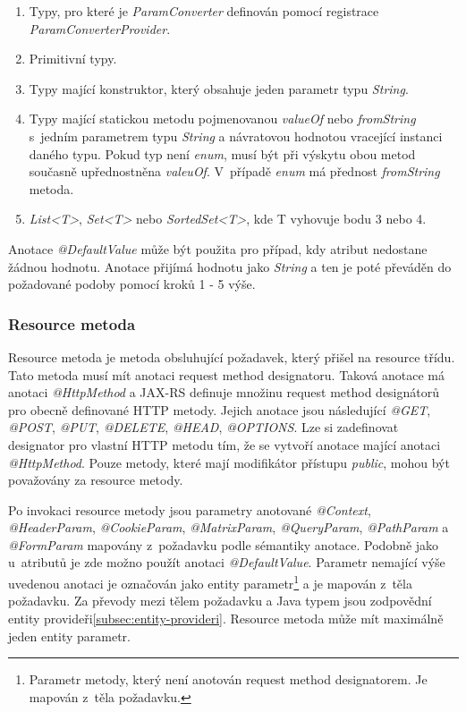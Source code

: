 \documentclass[11pt,twoside,a4paper]{book}
\begin{document}
\begin{enumerate}
  \item Typy, pro které je {\em ParamConverter} definován pomocí registrace
  {\em ParamConverterProvider}.
  \item Primitivní typy.
  \item Typy mající konstruktor, který obsahuje jeden parametr typu {\em
  String}.
  \item Typy mající statickou metodu pojmenovanou {\em valueOf} nebo {\em
  fromString} s~jedním parametrem typu {\em String} a návratovou hodnotou
  vracející instanci daného typu. Pokud typ není {\em enum}, musí být při
  výskytu obou metod současně upřednostněna {\em valeuOf}. V~případě {\em enum}
  má přednost {\em fromString} metoda.
  \item {\em List<T>}, {\em Set<T>} nebo {\em SortedSet<T>}, kde T vyhovuje bodu
  3 nebo 4.
\end{enumerate}

Anotace {\em @DefaultValue} může být použita pro případ, kdy atribut nedostane
žádnou hodnotu.
Anotace přijímá hodnotu jako {\em String} a ten je poté převáděn do požadované
podoby pomocí kroků 1 - 5 výše.

\subsubsection{Resource metoda}
\label{subsec:resource-metoda}

Resource metoda je metoda obsluhující požadavek, který přišel na resource třídu. Tato metoda
musí mít anotaci request method designatoru. Taková anotace má anotaci {\em
@HttpMethod} a JAX-RS definuje množinu request method designátorů pro obecně
definované HTTP metody.
Jejich anotace jsou následující {\em @GET}, {\em @POST}, {\em @PUT}, {\em
@DELETE}, {\em @HEAD}, {\em @OPTIONS}.
Lze si zadefinovat designator pro vlastní HTTP metodu tím, že se vytvoří anotace mající
anotaci {\em @HttpMethod}. Pouze metody, které mají modifikátor přístupu {\em
public}, mohou být považovány za resource metody.

Po invokaci resource metody jsou parametry anotované {\em @Context}, {\em @HeaderParam},
{\em @CookieParam}, {\em @MatrixParam}, {\em @QueryParam}, {\em @PathParam} a {\em @FormParam} mapovány
z~požadavku podle sémantiky anotace. Podobně jako u~atributů je zde možno použít anotaci
{\em @DefaultValue}. Parametr nemající výše uvedenou anotaci je označován jako
entity parametr\footnote{Parametr metody, který není anotován request method
designatorem. Je mapován z~těla požadavku.} a je mapován z~těla požadavku.
Za převody mezi tělem požadavku a Java typem jsou zodpovědní entity
provideři\ref{subsec:entity-provideri}.
Resource metoda může mít maximálně jeden entity parametr.
\end{document}
